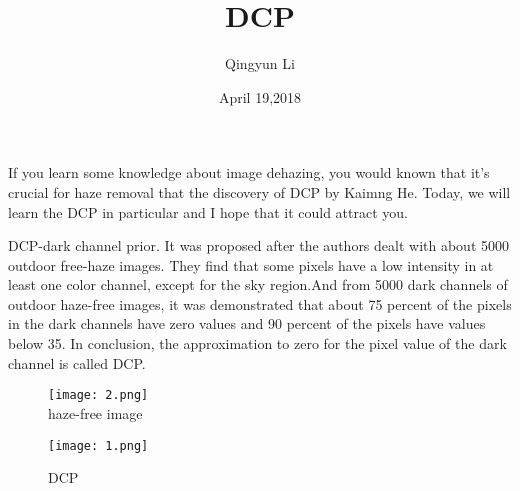 \documentclass{article}
\author{Qingyun Li}
\date{April 19,2018}
\title{DCP}
\begin{document}
\maketitle
 \par If you learn some knowledge about image dehazing, you would known that it's crucial for haze removal that the discovery of DCP by Kaimng He. Today, we will learn the DCP in particular and I hope that it could attract you.
 \par DCP-dark channel prior. It was proposed after the authors dealt with about 5000 outdoor free-haze images. They find that some pixels have a low intensity in at least one color channel, except for the sky region.And from 5000 dark channels of outdoor haze-free images, it was demonstrated that about 75 percent of the pixels in the dark channels have zero values and 90 percent of the pixels have values below 35. In conclusion, the approximation to zero for the pixel value of the dark channel is called DCP.
\begin{figure}[htbp]
\begin{minipage}{0.5\linewidth}
\centering{}
\texttt{[image: 2.png]}\\
\caption{haze-free image}\label{image} 
\end{minipage}
\hfill
\begin{minipage}{0.5\linewidth}
\centering{}
\texttt{[image: 1.png]}\\
\caption{DCP}\label{DCP}
\end{minipage} 
\end{figure}
\end{document}
